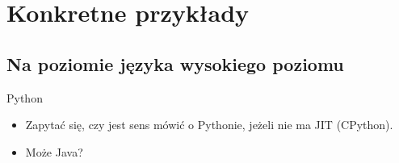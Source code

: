 \section{Konkretne przykłady} %
\subsection{Na poziomie języka wysokiego poziomu}
\begin{frame}[fragile]{Python}
	\begin{itemize}
		\item Zapytać się, czy jest sens mówić o Pythonie, jeżeli nie ma JIT (CPython).
		\item Może Java?
	\end{itemize}
\end{frame}

